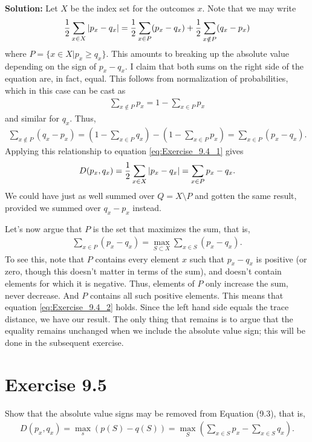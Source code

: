 \documentclass{book}
\begin{document}
    \textbf{Solution:} Let $X$ be the index set for the outcomes $x$. Note that we may write
    \begin{align} \label{eq:Exercise_9.4_1}
        \frac{1}{2}\sum_{x\in X} \abs{p_x-q_x} = \frac{1}{2}\sum_{x\in P} (p_x-q_x) + \frac{1}{2} \sum_{x\notin P} (q_x-p_x)
    \end{align}
    where $P = \{x\in X| p_x \geq q_x\}$. This amounts to breaking up the absolute value depending on the sign of $p_x-q_x$. I claim that both sums on the right side of the equation are, in fact, equal. This follows from normalization of probabilities, which in this case can be cast as 
    \begin{align}
        \sum_{x\notin P} p_x = 1-\sum_{x\in P} p_x
    \end{align}
    and similar for $q_x$. Thus,
    \begin{align}
        \sum_{x\notin P} (q_x-p_x) = (1-\sum_{x\in P}q_x) - (1-\sum_{x\in P}p_x) = \sum_{x\in P }(p_x - q_x).
    \end{align}
    Applying this relationship to equation \eqref{eq:Exercise_9.4_1} gives
    \begin{align}
        D(p_x, q_x) = \frac{1}{2}\sum_{x\in X} \abs{p_x-q_x} = \sum_{x\in P} p_x - q_x.
    \end{align}
    We could have just as well summed over $Q = X\setminus P$ and gotten the same result, provided we summed over $q_x-p_x$ instead. 
    
    Let's now argue that $P$ is the set that maximizes the sum, that is,
    \begin{align} \label{eq:Exercise_9.4_2}
        \sum_{x\in P } (p_x-q_x) = \max_{S\subset X} \sum_{x\in S} (p_x -q_x).
    \end{align}
    To see this, note that $P$ contains every element $x$ such that $p_x-q_x$ is positive (or zero, though this doesn't matter in terms of the sum), and doesn't contain elements for which it is negative. Thus, elements of $P$ only increase the sum, never decrease. And $P$ contains all such positive elements. This means that equation \eqref{eq:Exercise_9.4_2} holds. Since the left hand side equals the trace distance, we have our result. The only thing that remains is to argue that the equality remains unchanged when we include the absolute value sign; this will be done in the subsequent exercise. 
    
\section*{Exercise 9.5}
    Show that the absolute value signs may be removed from Equation (9.3), that is,
    \begin{align}
        D(p_x, q_x) = \max_s (p(S)-q(S)) = \max_S \left(\sum_{x\in S} p_x -\sum_{x\in S} q_x\right).
    \end{align}
    
\end{document}
